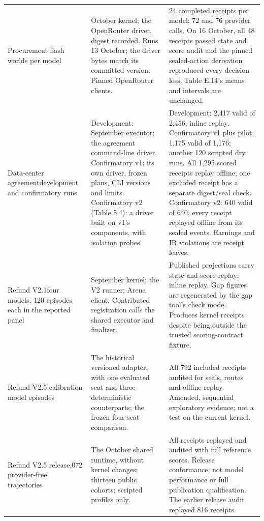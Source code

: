 \begin{longtable}{@{}P{1.28in}P{2.18in}P{3.0in}@{}}
\addlinespace[4pt]
Procurement flash worlds per model
& October kernel; the OpenRouter driver, digest recorded. Runs 13 October; the driver bytes match its committed version. Pinned OpenRouter clients.
& 24 completed receipts per model; 72 and 76 provider calls. On 16 October, all 48 receipts passed state and score audit and the pinned sealed-action derivation reproduced every decision loss. Table E.14's means and intervals are unchanged.\\
\addlinespace[4pt]
Data-center agreement\newline development and confirmatory runs
& Development: September executor; the agreement command-line driver. Confirmatory v1: its own driver, frozen plans, CLI versions and limits. Confirmatory v2 (Table 5.4): a driver built on v1's components, with isolation probes.
& Development: 2,417 valid of 2,456, inline replay. Confirmatory v1 plus pilot: 1,175 valid of 1,176; another 120 scripted dry runs. All 1,295 scored receipts replay offline; one excluded receipt has a separate digest/seal check. Confirmatory v2: 640 valid of 640, every receipt replayed offline from its sealed events. Earnings and IR violations are receipt leaves.\\
\addlinespace[4pt]
Refund V2.1\newline four models, 120 episodes each in the reported panel
& September kernel; the V2 runner; Arena client. Contributed registration calls the shared executor and finalizer.
& Published projections carry state-and-score replay; inline replay. Gap figures are regenerated by the gap tool's check mode. Produces kernel receipts despite being outside the trusted scoring-contract fixture.\\
\addlinespace[4pt]
Refund V2.5 calibration model episodes
& The historical versioned adapter, with one evaluated seat and three deterministic counterparts; the frozen four-seat comparison.
& All 792 included receipts audited for seals, routes and offline replay. Amended, sequential exploratory evidence; not a test on the current kernel.\\
\addlinespace[4pt]
Refund V2.5 release,072 provider-free trajectories
& The October shared runtime, without kernel changes; thirteen public cohorts; scripted profiles only.
& All receipts replayed and audited with full reference scores. Release conformance, not model performance or full publication qualification. The earlier release audit replayed 816 receipts.\\
\end{longtable}
\endgroup
